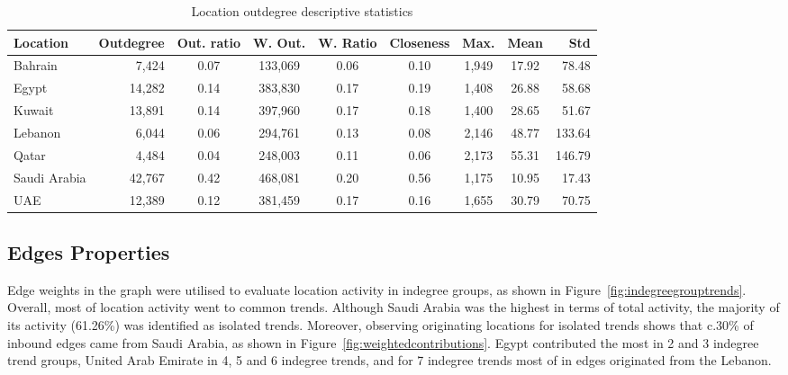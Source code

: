 \documentclass{llncs}
\begin{document}
\begin{table}[!h]
\centering
\caption{Location outdegree descriptive statistics}
\begin{tabular}{@{}lrccccccr@{}}
\toprule
Location & Outdegree & Out. ratio & W. Out. & W. Ratio & Closeness & Max. &  Mean & Std \\ 
\midrule
Bahrain &           7,424 & 0.07 & 133,069 & 0.06 & 0.10 & 1,949 & 17.92 &   78.48\\
Egypt &            14,282 & 0.14 & 383,830 & 0.17 & 0.19 & 1,408 & 26.88 &   58.68\\
Kuwait &          13,891 & 0.14 & 397,960 & 0.17 & 0.18 & 1,400 & 28.65 &   51.67\\
Lebanon &         6,044 & 0.06 & 294,761 & 0.13 & 0.08 & 2,146 & 48.77 & 133.64\\
Qatar &              4,484 & 0.04 & 248,003 & 0.11 & 0.06 & 2,173 & 55.31 & 146.79\\
Saudi Arabia & 42,767 & 0.42 & 468,081 & 0.20 & 0.56 & 1,175 & 10.95 &   17.43\\
UAE &              12,389 & 0.12 & 381,459 & 0.17 & 0.16 & 1,655 & 30.79 &   70.75\\
\bottomrule
\end{tabular}
\label{tbl:locationoutdegree}
\end{table}

\subsection{Edges Properties}

Edge weights in the graph were utilised to evaluate location activity
in indegree groups, as shown in
Figure~\ref{fig:indegreegrouptrends}. Overall, most of location
activity went to common trends. Although Saudi Arabia was the highest
in terms of total activity, the majority of its activity (61.26\%) was
identified as isolated trends. Moreover, observing originating locations
for isolated trends shows that c.30\% of inbound edges came from Saudi
Arabia, as shown in Figure~\ref{fig:weightedcontributions}. Egypt
contributed the most in 2 and 3 indegree trend groups, United Arab
Emirate in 4, 5 and 6 indegree trends, and for 7 indegree trends most
of in edges originated from the Lebanon.
\end{document}
